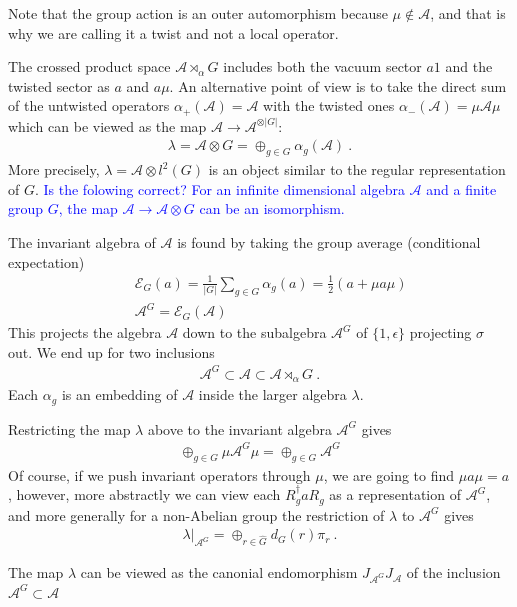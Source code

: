 \documentclass{article}
\newcommand{\mA}{\mathcal{A}}
\newcommand{\nn}{\nonumber}
\theoremstyle{definition}
\newcommand{\NL}[1]{\textcolor{blue}{#1}}
\begin{document}
  Note that the group action is an outer automorphism because $\mu\notin \mA$, and
  that is why we are calling it a twist and not a local operator.

  The crossed product space $\mA\rtimes_{\alpha}G$ includes both the vacuum sector
  $a 1$ and the twisted sector as $a$ and $a \mu$. An alternative point of view
  is to take the direct sum of the untwisted operators $\alpha_{+}(\mA)=\mA$
  with the twisted ones $\alpha_{-}(\mA)=\mu \mA \mu$ which can be viewed as the
  map $\mA\to \mA^{\otimes |G|}$:
  \begin{eqnarray}
    \lambda=\mA\otimes G=\oplus_{g\in G}\alpha_g(\mA)\ .
  \end{eqnarray}
  More precisely, $\lambda=\mA\otimes l^{2}(G)$ is an object similar to the
  regular representation of $G$. \NL{Is the folowing correct? For an infinite dimensional algebra $\mA$ and a finite group $G$, the map $\mA\to \mA\otimes G$ can be an isomorphism.}

  The invariant algebra of $\mA$ is found by taking the group average (conditional
  expectation)
  \begin{eqnarray}
    &&\mathcal{E}_G(a)=\frac{1}{|G|}\sum_{g\in G}\alpha_g(a)=\frac{1}{2}(a+\mu a
    \mu)\nn\\
    &&\mA^G=\mathcal{E}_G(\mA)
  \end{eqnarray}
  This projects the algebra $\mA$ down to the subalgebra $\mA^{G}$ of $\{1,\epsilon
  \}$ projecting $\sigma$ out. We end up for two inclusions
  \begin{eqnarray}
    \mA^G\subset \mA\subset \mA\rtimes_\alpha G\ .
  \end{eqnarray}
  Each $\alpha_{g}$ is an embedding of $\mA$ inside the larger algebra $\lambda$.

  Restricting the map $\lambda$ above to the invariant algebra $\mA^{G}$ gives
  \begin{eqnarray}
    \oplus_{g\in G} \mu \mA^G \mu=\oplus_{g\in G}\mA^G
  \end{eqnarray}
  Of course, if we push invariant operators through $\mu$, we are going to find
  $\mu a \mu=a$, however, more abstractly we can view each
  $R_{g}^{\dagger}a R_{g}$ as a representation of $\mA^{G}$, and more generally for
  a non-Abelian group the restriction of $\lambda$ to $\mA^{G}$ gives
  \begin{eqnarray}
    \lambda\big|_{\mA^G}=\oplus_{r \in \hat{G}}d_G(r)\pi_r\ .
  \end{eqnarray}

  The map $\lambda$ can be viewed as the canonial endomorphism
  $J_{\mA^G}J_{\mA}$ of the inclusion $\mA^{G}\subset \mA$
\end{document}
